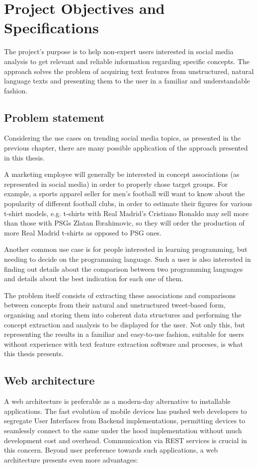 \chapter{Project Objectives and Specifications}
The project's purpose is to help non-expert users interested in social media analysis to get relevant and reliable information regarding specific concepts. The approach solves the problem of acquiring text features from unstructured, natural language texts and presenting them to the user in a familiar and understandable fashion.

\section{Problem statement}
Considering the use cases on trending social media topics, as presented in the previous chapter, there are many possible application of the approach presented in this thesis.

A marketing employee will generally be interested in concept associations (as represented in social media) in order to properly chose target groups. For example, a sports apparel seller for men's football will want to know about the popularity of different football clubs, in order to estimate their figures for various t-shirt models, e.g. t-shirts with Real Madrid's Cristiano Ronaldo may sell more than those with PSGs Zlatan Ibrahimovic, so they will order the production of more Real Madrid t-shirts as opposed to PSG ones.

Another common use case is for people interested in learning programming, but needing to decide on the programming language. Such a user is also interested in finding out details about the comparison between two programming languages and details about the best indication for each one of them.

The problem itself consists of extracting these associations and comparisons between concepts from their natural and unstructured tweet-based form, organising and storing them into coherent data structures and performing the concept extraction and analysis to be displayed for the user. Not only this, but representing the results in a familiar and easy-to-use fashion, suitable for users without experience with text feature extraction software and proceses, is what this thesis presents.

\section{Web architecture}
A web architecture is preferable as a modern-day alternative to installable applications. The fast evolution of mobile devices has pushed web developers to segregate User Interfaces from Backend implementations, permitting devices to seamlessly connect to the same under the hood implementation without much development cost and overhead. Communication via REST services is crucial in this concern. Beyond user preference towards such applications, a web architecture presents even more advantages:

